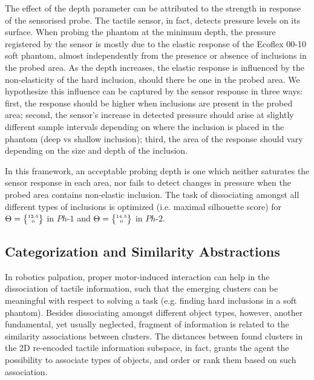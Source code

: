 \documentclass[]{interact}
\theoremstyle{plain}%
\theoremstyle{definition}
\theoremstyle{remark}
\begin{document}
The effect of the depth parameter can be attributed to the strength in response of the sensorised probe. 
The tactile sensor, in fact, detects pressure levels on its surface. When probing the phantom at the minimum 
depth, the pressure registered by the sensor is mostly due to the elastic response of the Ecoflex 00-10 soft 
phantom, almost independently from the presence or absence of inclusions in the probed area. As the depth 
increases, the elastic response is influenced by the non-elasticity of the hard inclusion, should there be 
one in the probed area. We hypothesize this influence can be captured by the sensor response in three ways: 
first, the response should be higher when inclusions are present in the probed area; second, the sensor's increase 
in detected pressure should arise at slightly different sample intervals depending on where the inclusion is placed 
in the phantom (deep vs shallow inclusion); third, the area of the response should vary depending on the 
size and depth of the inclusion. 

In this framework, an acceptable probing depth is one which neither saturates the sensor response in each area, 
nor fails to detect changes in pressure when the probed area contains non-elastic inclusion. The task of 
dissociating amongst all different types of inclusions is optimized (i.e. maximal silhouette score) for
 $\Theta = \tiny{\begin{Bmatrix}12.5\\ 0\end{Bmatrix}}$ in $Ph\text{-}1$ and 
 $\Theta = \tiny{\begin{Bmatrix}14.5\\ 0\end{Bmatrix}}$ in $Ph\text{-}2$.


\subsection{Categorization and Similarity Abstractions}
In robotics palpation, proper motor-induced interaction can help in the dissociation 
of tactile information, such that the emerging clusters can be meaningful 
with respect to solving a task (e.g. finding hard inclusions in a soft phantom). 
Besides dissociating amongst different object types, however, another fundamental, yet usually neglected, 
fragment of information is related to the similarity associations between clusters. The distances 
between found clusters in the 2D re-encoded tactile information subspace, in fact, grants the agent 
the possibility to associate types of objects, and order or rank them based on such association.
\end{document}
